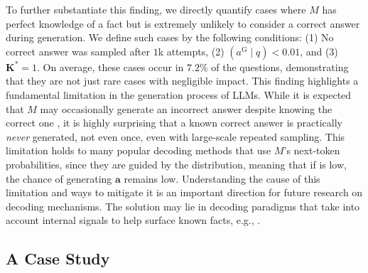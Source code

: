 To further substantiate this finding, we directly quantify cases where $M$ has perfect knowledge of a fact but is extremely unlikely to consider a correct answer during generation. We define such cases by the following conditions: (1) No correct answer was sampled after $1$k attempts, (2) \baselineA$(a^\text{G}\mid q) < 0.01$, and (3) $\mathbf{K}^\ast=1$. On average, these cases occur in $7.2\%$ of the questions, demonstrating that they are not just rare cases with negligible impact.
This finding highlights a fundamental limitation in the generation process of LLMs. While it is expected that $M$ may occasionally generate an incorrect answer despite knowing the correct one \citep{simhi2024distinguishing}, it is highly surprising that a known correct answer is practically \textit{never} generated, not even once, even with large-scale repeated sampling. 
This limitation holds to many popular decoding methods that use $M$’s next-token probabilities, since they are guided by the \baselineA distribution, meaning that if \baselineA is low, the chance of generating $\mathbf{a}$ remains low.
Understanding the cause of this limitation and ways to mitigate it is an important direction for future research on decoding mechanisms.
The solution may lie in decoding paradigms that take into account internal signals to help surface known facts, e.g., \citep{rimsky-etal-2024-steering}.


\vspace{-6pt}
\subsection{A Case Study}
\label{sec:case_study}

\vspace{-6pt}

